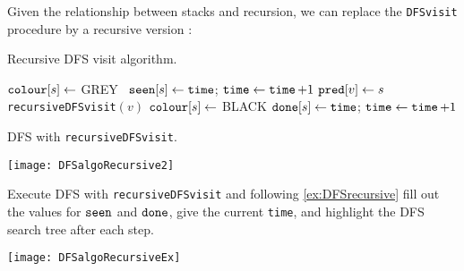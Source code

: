 Given the relationship between stacks and recursion, we can replace the \texttt{DFSvisit} procedure by
a recursive version : 

\begin{algorithm}[H]
  \caption{Recursive DFS visit algorithm.}
    \label{alg:DFSreccode}
\begin{algorithmic}[1]
	\State $\operatorname{\text{\texttt{colour}}}[s] \gets $ GREY \
	\State $\operatorname{\text{\texttt{seen}}}[s] \gets \operatorname{\text{\texttt{time}}}$; $\operatorname{\text{\texttt{time}}} \gets \operatorname{\text{\texttt{time}}} + 1$
		 
			\State $\operatorname{\text{\texttt{pred}}}[v] \gets s$ 
			\State \texttt{recursiveDFSvisit}$(v)$ 
		\EndIf
	\EndFor
	\State $\operatorname{\text{\texttt{colour}}}[s] \gets $ BLACK 
	\State $\operatorname{\text{\texttt{done}}}[s] \gets \operatorname{\text{\texttt{time}}} $; $\operatorname{\text{\texttt{time}}} \gets \operatorname{\text{\texttt{time}}} + 1$
\EndFunction
\end{algorithmic}
\end{algorithm}

\begin{Boxample} \label{ex:DFSrecursive}
DFS with \texttt{recursiveDFSvisit}. 
\begin{center}
  \texttt{[image: DFSalgoRecursive2]}
\end{center}
\end{Boxample}

\begin{Boxample}
Execute DFS with \texttt{recursiveDFSvisit} and following \cref{ex:DFSrecursive} fill out the values for $\operatorname{\text{\texttt{seen}}}$ and $\operatorname{\text{\texttt{done}}}$, give the current \texttt{time}, 
and highlight the DFS search tree after each step. 

\begin{center}
  \texttt{[image: DFSalgoRecursiveEx]}
\end{center}
\end{Boxample}

